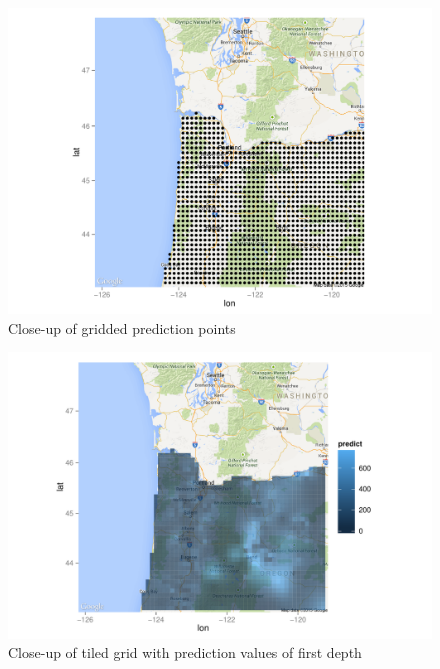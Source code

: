 \documentclass[12pt,twoside]{reedthesis}
\begin{document}
 
 \begin{figure}[h]
	   
	       \centering
	  
	    \includegraphics[scale=0.9]{points_zoom}
	
	     \caption{Close-up of gridded prediction points}
	 \label{grid}
	\end{figure}
 
\begin{figure}[h]
	   
	       \centering
	  
	    \includegraphics[scale=0.9]{tile_zoom}
	
	     \caption{Close-up of tiled grid with prediction values of first depth}
	 \label{tile}
	\end{figure}
	
\end{document}

